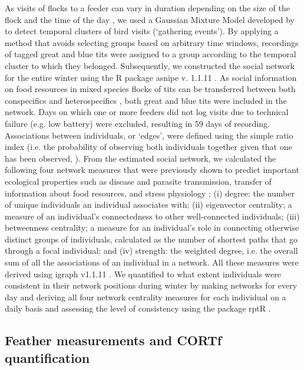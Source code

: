 \documentclass[10pt, twoside]{book} %
\begin{document}
	As visits of flocks to a feeder can vary in duration depending on the size of the flock and the time of the day \citep{Farine2015}, we used a Gaussian Mixture Model developed by \citet{Psorakis2012} to detect temporal clusters of bird visits (`gathering events'). By applying a method that avoids selecting groups based on arbitrary time windows, recordings of tagged great and blue tits were assigned to a group according to the temporal cluster to which they belonged. Subsequently, we constructed the social network for the entire winter using the R package asnipe v. 1.1.11 \citep{Farine2013}. As social information on food resources in mixed species flocks of tits can be transferred between both conspecifics and heterospecifics \citep{Farine2015, Firth2016}, both great and blue tits were included in the network. Days on which one or more feeders did not log visits due to technical failure (e.g. low battery) were excluded, resulting in 59 days of recording. Associations between individuals, or `edges', were defined using the simple ratio index (i.e. the probability of observing both individuals together given that one has been observed, \citealt{Whitehead1995}). From the estimated social network, we calculated the following four network measures that were previously shown to predict important ecological properties such as disease and parasite transmission, transfer of information about food resources, and stress physiology \citep{Godfrey2009, Aplin2012, Bull2012, MacIntosh2012, Boogert2014}: (i) degree: the number of unique individuals an individual associates with; (ii) eigenvector centrality; a measure of an individual's connectedness to other well-connected individuals; (iii) betweenness centrality; a measure for an individual's role in connecting otherwise distinct groups of individuals, calculated as the number of shortest paths that go through a focal individual; and (iv) strength: the weighted degree, i.e. the overall sum of all the associations of an individual in a network. All these measures were derived using igraph v1.1.11 \citep{Csardi2006}. We quantified to what extent individuals were consistent in their network positions during winter by making networks for every day and deriving all four network centrality measures for each individual on a daily basis and assessing the level of consistency using the package rptR \citep{Stoffel2017}. 
	
	\subsection*{Feather measurements and CORTf quantification}
	
\end{document}
